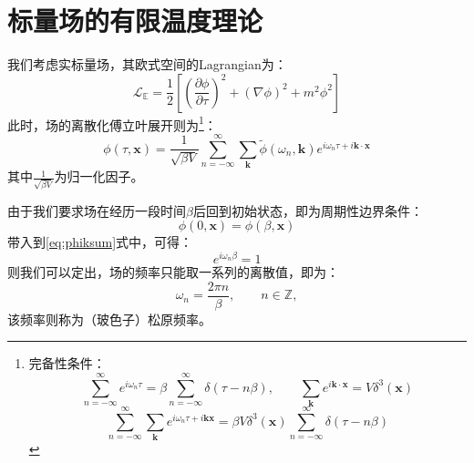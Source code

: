 \section{标量场的有限温度理论}
我们考虑实标量场，其欧式空间的Lagrangian为：
\begin{equation}
    \mathscr{L}_\mathbb{E} = \frac{1}{2}\left[\left( \frac{\partial \phi }{\partial\tau} \right)^2 +(\nabla\phi)^2 +m^2\phi^2 \right]\label{eq:lagEphi}
\end{equation}
此时，场的离散化傅立叶展开则为\footnote{%
完备性条件：\[\sum_{n=-\infty}^{\infty} e^{i\omega_n\tau}=\beta\sum_{n=-\infty}^{\infty}\delta(\tau-n\beta),\qquad\sum_{\boldsymbol{k}} e^{i\boldsymbol{k}\cdot\boldsymbol{x}}=V\delta^3(\boldsymbol{x})\]
\[\sum_{n=-\infty}^{\infty}\sum_{\boldsymbol{k}} e^{i\omega_n\tau +i\boldsymbol{k}\boldsymbol{x}} = \beta V \delta^3(\boldsymbol{x})\sum_{n=-\infty}^{\infty}\delta(\tau-n\beta)\]}：
\begin{equation}
    \phi(\tau, \boldsymbol{x}) = \frac{1}{\sqrt{\beta V}}\sum_{n=-\infty}^{\infty}\sum_{\boldsymbol{k}}\tilde{\phi}(\omega_n, \boldsymbol{k})e^{i\omega_n\tau + i\boldsymbol{k}\cdot\boldsymbol{x}}\label{eq:phiksum}
\end{equation}
其中$\frac{1}{\sqrt{\beta V}}$为归一化因子。

由于我们要求场在经历一段时间$\beta$后回到初始状态，即为周期性边界条件：
\begin{equation}
    \phi(0,\boldsymbol{x}) = \phi(\beta,\boldsymbol{x})
\end{equation}
带入到\eqref{eq:phiksum}式中，可得：
\begin{equation}
    e^{i\omega_n\beta} = 1
\end{equation}
则我们可以定出，场的频率只能取一系列的离散值，即为：
\begin{equation}
    \omega_n = \frac{2\pi n}{\beta}, \qquad n\in\mathbb{Z},\label{eq:mastubarab}
\end{equation}
该频率则称为（玻色子）松原频率。

